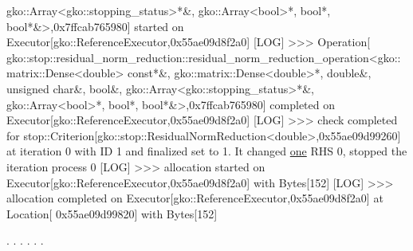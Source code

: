 \begin{DoxyCode}
      gko::Array<gko::stopping\_status>*&, gko::Array<bool>*, \textcolor{keywordtype}{bool}*, \textcolor{keywordtype}{bool}*&>,0x7ffcab765980]
 started on Executor[gko::ReferenceExecutor,0x55ae09d8f2a0]
[LOG] >>> Operation[
      gko::stop::residual\_norm\_reduction::residual\_norm\_reduction\_operation<gko::matrix::Dense<double> \textcolor{keyword}{const}*&, gko::matrix::Dense<double>*, \textcolor{keywordtype}{double}&, \textcolor{keywordtype}{unsigned} \textcolor{keywordtype}{char}&, \textcolor{keywordtype}{bool}&, 
      gko::Array<gko::stopping\_status>*&, gko::Array<bool>*, \textcolor{keywordtype}{bool}*, \textcolor{keywordtype}{bool}*&>,0x7ffcab765980]
 completed on Executor[gko::ReferenceExecutor,0x55ae09d8f2a0]
[LOG] >>> check completed \textcolor{keywordflow}{for} stop::Criterion[gko::stop::ResidualNormReduction<double>,0x55ae09d99260] at 
      iteration 0 with ID 1 and finalized \textcolor{keyword}{set} to 1. It changed \hyperlink{namespacegko_a0059e27f8f4bc348ff65c1e60caf47c8}{one} RHS 0, stopped the iteration process 0
[LOG] >>> allocation started on Executor[gko::ReferenceExecutor,0x55ae09d8f2a0] with Bytes[152]
[LOG] >>> allocation completed on Executor[gko::ReferenceExecutor,0x55ae09d8f2a0] at Location[
      0x55ae09d99820] with Bytes[152]

.
.
.
.
.
.


\end{DoxyCode}
